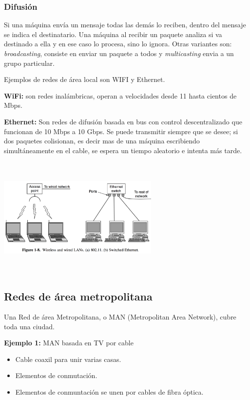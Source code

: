 \documentclass[10pt,a4paper]{report}
\begin{document}
\subsubsection{Difusión}
\par Si una máquina envía un mensaje todas las demás lo reciben, dentro del mensaje 
se indica el destinatario. Una máquina al recibir un paquete analiza si va destinado a 
ella y en ese caso lo procesa, sino lo ignora. Otras variantes son: \textit{broadcasting}, 
consiste en enviar un paquete a todos y \textit{multicasting} envia a un grupo 
particular.
\par Ejemplos de redes de área local son WIFI y Ethernet.

\textbf{WiFi:} son redes inalámbricas, operan a velocidades desde 11 hasta cientos de 
Mbps.

\textbf{Ethernet:} Son redes de difusión basada en bus con control descentralizado 
que funcionan de 10 Mbps a 10 Gbps. Se puede transmitir siempre que se desee; si 
dos paquetes colisionan, es decir mas de una máquina escribiendo simultáneamente en 
el cable, se espera un tiempo aleatorio e intenta más tarde.

\begin{center} 
	\includegraphics[width=8cm, height=6cm]{./imagenes/arealocal.png} 
\end{center}

\subsection{Redes de área metropolitana}
\par Una Red de área Metropolitana, o MAN (Metropolitan Area Network), cubre toda 
una ciudad.

\textbf{Ejemplo 1:} MAN basada en TV por cable
	\begin{itemize}
		\item Cable coaxil para unir varias casas.
		\item Elementos de conmutación.
		\item Elementos de conmuntación se unen por cables de fibra óptica.
	\end{itemize}
	
\end{document}
